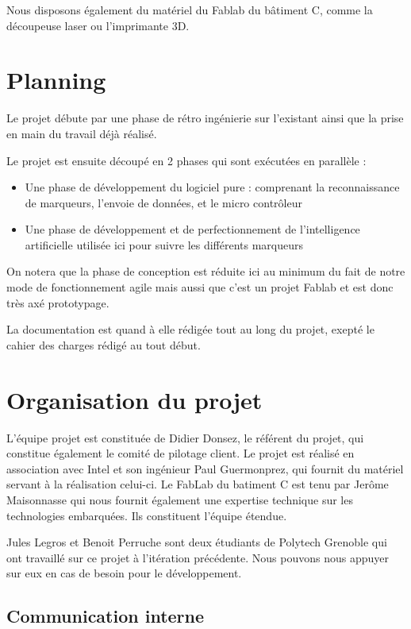 \documentclass[a4paper,12pt]{article}
\begin{document}
Nous disposons également du matériel du Fablab du bâtiment C, comme la découpeuse laser
ou l'imprimante 3D.

\section{Planning}

Le projet débute par une phase de rétro ingénierie sur l'existant ainsi que la prise en
main du travail déjà réalisé.

Le projet est ensuite découpé en 2 phases qui sont exécutées en parallèle :
\begin{itemize}
    \item Une phase de développement du logiciel pure : comprenant la reconnaissance de
        marqueurs, l'envoie de données, et le micro contrôleur
    \item Une phase de développement et de perfectionnement de l'intelligence
        artificielle utilisée ici pour suivre les différents marqueurs
\end{itemize}

On notera que la phase de conception est réduite ici au minimum du fait de notre mode de
fonctionnement agile mais aussi que c'est un projet Fablab et est donc très axé
prototypage.

La documentation est quand à elle rédigée tout au long du projet, exepté le cahier des
charges rédigé au tout début. 


\section{Organisation du projet}

L'équipe projet est constituée de Didier Donsez, le référent du projet, qui constitue
également le comité de pilotage client.
Le projet est réalisé en association avec Intel et son ingénieur Paul Guermonprez, qui
fournit du matériel servant à la réalisation celui-ci. Le FabLab du batiment C est tenu
par Jerôme Maisonnasse qui nous fournit également une expertise technique sur les
technologies embarquées. Ils constituent l'équipe étendue.

Jules Legros et Benoit Perruche sont deux étudiants de Polytech Grenoble qui
ont travaillé sur ce projet à l'itération précédente. Nous pouvons nous appuyer sur eux
en cas de besoin pour le développement.

\subsection{Communication interne}
\end{document}

